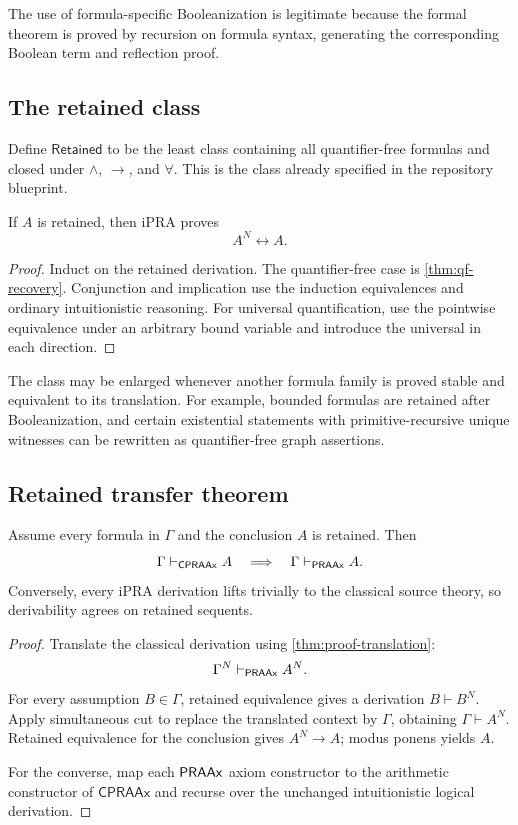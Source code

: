 The use of formula-specific Booleanization is legitimate because the formal theorem is proved by recursion on formula syntax, generating the corresponding Boolean term and reflection proof.

\subsection{The retained class}

Define \(\mathsf{Retained}\) to be the least class containing all quantifier-free formulas and closed under \(\wedge\), \(\to\), and \(\forall\).  This is the class already specified in the repository blueprint.

\begin{theorem}
\label{thm:retained-equivalence}
If \(A\) is retained, then iPRA proves
\[
  A^N\leftrightarrow A.
\]
\end{theorem}

\begin{proof}
Induct on the retained derivation.  The quantifier-free case is \cref{thm:qf-recovery}.  Conjunction and implication use the induction equivalences and ordinary intuitionistic reasoning.  For universal quantification, use the pointwise equivalence under an arbitrary bound variable and introduce the universal in each direction.
\end{proof}

The class may be enlarged whenever another formula family is proved stable and equivalent to its translation.  For example, bounded formulas are retained after Booleanization, and certain existential statements with primitive-recursive unique witnesses can be rewritten as quantifier-free graph assertions.

\subsection{Retained transfer theorem}

\begin{theorem}
\label{thm:retained-transfer}
Assume every formula in \(\Gamma\) and the conclusion \(A\) is retained.  Then
\[
 \Gamma\vdash_{\mathsf{CPRAAx}}A
 \quad\Longrightarrow\quad
 \Gamma\vdash_{\mathsf{PRAAx}}A.
\]
Conversely, every iPRA derivation lifts trivially to the classical source theory, so derivability agrees on retained sequents.
\end{theorem}

\begin{proof}
Translate the classical derivation using \cref{thm:proof-translation}:
\[
 \Gamma^N\vdash_{\mathsf{PRAAx}}A^N.
\]
For every assumption \(B\in\Gamma\), retained equivalence gives a derivation \(B\vdash B^N\).  Apply simultaneous cut to replace the translated context by \(\Gamma\), obtaining \(\Gamma\vdash A^N\).  Retained equivalence for the conclusion gives \(A^N\to A\); modus ponens yields \(A\).

For the converse, map each \(\mathsf{PRAAx}\) axiom constructor to the arithmetic constructor of \(\mathsf{CPRAAx}\) and recurse over the unchanged intuitionistic logical derivation.
\end{proof}

